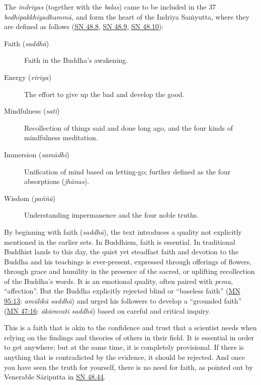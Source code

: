 \documentclass[12pt,openany]{book}%
\begin{document}
The \textit{indriyas} (together with the \textit{balas}) came to be included in the 37 \textit{\textsanskrit{bodhipakkhiyadhammā}}, and form the heart of the Indriya \textsanskrit{Saṁyutta}, where they are defined as follows (\href{https://suttacentral.net/sn48.8}{SN 48.8}, \href{https://suttacentral.net/sn48.9}{SN 48.9}, \href{https://suttacentral.net/sn48.10}{SN 48.10}):

\begin{description}%
\item[Faith (\textit{\textsanskrit{saddhā}})] Faith in the Buddha’s awakening.%
\item[Energy (\textit{viriya})] The effort to give up the bad and develop the good.%
\item[Mindfulness (\textit{sati})] Recollection of things said and done long ago, and the four kinds of mindfulness meditation.%
\item[Immersion (\textit{\textsanskrit{samādhi}})] Unification of mind based on letting-go; further defined as the four absorptions (\textit{\textsanskrit{jhānas}}).%
\item[Wisdom (\textit{\textsanskrit{paññā}})] Understanding impermanence and the four noble truths.%
\end{description}

By beginning with faith (\textit{\textsanskrit{saddhā}}), the text introduces a quality not explicitly mentioned in the earlier sets. In Buddhism, faith is essential. In traditional Buddhist lands to this day, the quiet yet steadfast faith and devotion to the Buddha and his teachings is ever-present, expressed through offerings of flowers, through grace and humility in the presence of the sacred, or uplifting recollection of the Buddha’s words. It is an emotional quality, often paired with \textit{pema}, “affection”. But the Buddha explicitly rejected blind or “baseless faith” (\href{https://suttacentral.net/mn95/en/sujato\#13}{MN 95:13}: \textit{\textsanskrit{amūlikā} \textsanskrit{saddhā}}) and urged his followers to develop a “grounded faith” (\href{https://suttacentral.net/mn47/en/sujato\#16}{MN 47:16}: \textit{\textsanskrit{ākāravatī} \textsanskrit{saddhā}}) based on careful and critical inquiry.

This is a faith that is akin to the confidence and trust that a scientist needs when relying on the findings and theories of others in their field. It is essential in order to get anywhere; but at the same time, it is completely provisional. If there is anything that is contradicted by the evidence, it should be rejected. And once you have seen the truth for yourself, there is no need for faith, as pointed out by Venerable \textsanskrit{Sāriputta} in \href{https://suttacentral.net/sn48.44}{SN 48.44}.
\end{document}
